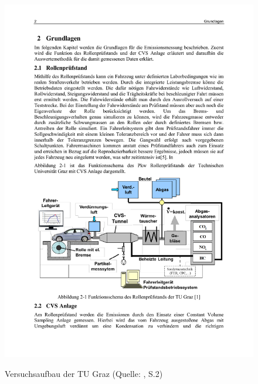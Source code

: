 \begin{figure}[H]
	\myfloatalign
	{\includegraphics[width=.9\linewidth]{gfx/related/graz_versuch.pdf}} \quad
	\caption[Versuchsaufbau der TU Graz (Quelle: \cite{tu_graz}, S.2)]
	{Versuchsaufbau der TU Graz (Quelle: \cite{tu_graz}, S.2)}
	\label{fig:aufbau_graz}
\end{figure}

